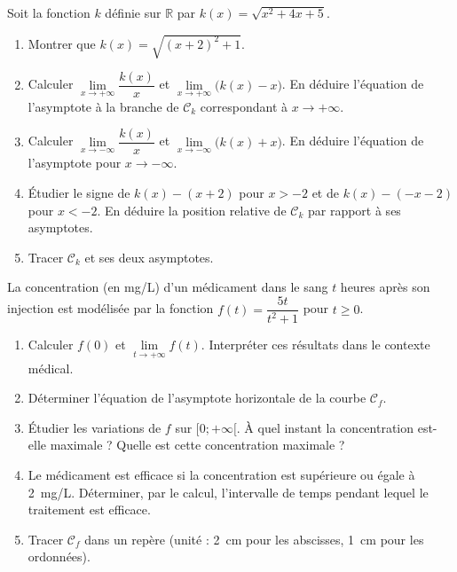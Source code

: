 \documentclass[11pt]{article}
\begin{document}
\begin{exercice}
Soit la fonction $k$ définie sur $\mathbb{R}$ par $k(x)=\sqrt{x^2+4x+5}$.
\begin{enumerate}
    \item Montrer que $k(x)=\sqrt{(x+2)^2+1}$.
    \item Calculer $\lim\limits_{x\to +\infty} \dfrac{k(x)}{x}$ et $\lim\limits_{x\to +\infty} \bigl(k(x)-x\bigr)$. En déduire l'équation de l'asymptote à la branche de $\mathcal{C}_k$ correspondant à $x\to +\infty$.
    \item Calculer $\lim\limits_{x\to -\infty} \dfrac{k(x)}{x}$ et $\lim\limits_{x\to -\infty} \bigl(k(x)+x\bigr)$. En déduire l'équation de l'asymptote pour $x\to -\infty$.
    \item Étudier le signe de $k(x)-(x+2)$ pour $x > -2$ et de $k(x)-(-x-2)$ pour $x < -2$. En déduire la position relative de $\mathcal{C}_k$ par rapport à ses asymptotes.
    \item Tracer $\mathcal{C}_k$ et ses deux asymptotes.
\end{enumerate}
\end{exercice}

\begin{exercice}
La concentration (en mg/L) d'un médicament dans le sang $t$ heures après son injection est modélisée par la fonction $f(t)=\dfrac{5t}{t^2+1}$ pour $t \geqslant 0$.
\begin{enumerate}
    \item Calculer $f(0)$ et $\lim\limits_{t\to +\infty} f(t)$. Interpréter ces résultats dans le contexte médical.
    \item Déterminer l'équation de l'asymptote horizontale de la courbe $\mathcal{C}_f$.
    \item Étudier les variations de $f$ sur $[0;+\infty[$. À quel instant la concentration est-elle maximale ? Quelle est cette concentration maximale ?
    \item Le médicament est efficace si la concentration est supérieure ou égale à \SI{2}{mg/L}. Déterminer, par le calcul, l'intervalle de temps pendant lequel le traitement est efficace.
    \item Tracer $\mathcal{C}_f$ dans un repère (unité : \SI{2}{cm} pour les abscisses, \SI{1}{cm} pour les ordonnées).
\end{enumerate}
\end{exercice}
\end{document}
